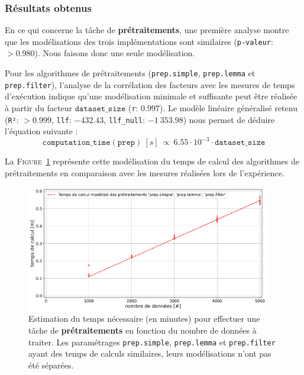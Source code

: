 		\subsubsection{Résultats obtenus}
				
			
			En ce qui concerne la tâche de \textbf{prétraitements}, une première analyse montre que les modélisations des trois implémentations sont similaires (\texttt{p-valeur}: $> 0.980$). Nous faisons donc une seule modélisation.
			
			Pour les algorithmes de prétraitements (\texttt{prep.simple}, \texttt{prep.lemma} et \texttt{prep.filter}), l'analyse de la corrélation des facteurs avec les mesures de temps d'exécution indique qu'une modélisation minimale et suffisante peut être réalisée à partir du facteur $\texttt{dataset\_size}$ (\texttt{r}: $0.997$).
			Le modèle linéaire généralisé retenu (\texttt{R²}: $> 0.999$, \texttt{llf}: $-432.43$, \texttt{llf\_null}: $-1~353.98$) nous permet de déduire l'équation suivante :
			\begin{equation}
				\texttt{computation\_time}(\texttt{prep})~[s]~
				\propto~6.55 \cdot 10^{-3} \cdot \texttt{dataset\_size}
			\end{equation}
			
			La \textsc{Figure~\ref{figure:4.3.2-ETUDE-COUTS-TEMPS-CALCUL-MODELISATION-PREPROCESSING}} représente cette modélisation du temps de calcul des algorithmes de prétraitements en comparaison avec les mesures réalisées lors de l'expérience.
			\newline
			\begin{figure}[!htb]
				\centering
				\includegraphics[width=0.95\textwidth]{figures/etude-temps-calcul-modelisation-1prep}
				\caption{
					Estimation du temps nécessaire (en minutes) pour effectuer une tâche de \textbf{prétraitements} en fonction du nombre de données à traiter. Les paramétrages \texttt{prep.simple}, \texttt{prep.lemma} et \texttt{prep.filter} ayant des temps de calculs similaires, leurs modélisations n'ont pas été séparées.
				}
				\label{figure:4.3.2-ETUDE-COUTS-TEMPS-CALCUL-MODELISATION-PREPROCESSING}
			\end{figure}
			
